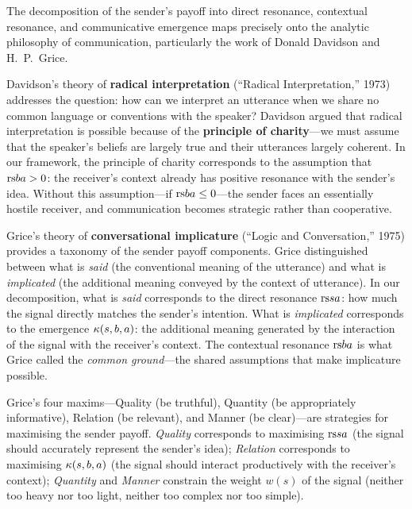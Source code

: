 \begin{interpretation}
\label{interp:ch13:davidson_grice}
The decomposition of the sender's payoff into direct resonance, contextual
resonance, and communicative emergence maps precisely onto the analytic
philosophy of communication, particularly the work of Donald Davidson and
H.~P.~Grice.

Davidson's theory of \textbf{radical interpretation} (``Radical
Interpretation,'' 1973) addresses the question: how can we interpret an
utterance when we share no common language or conventions with the speaker?
Davidson argued that radical interpretation is possible because of the
\textbf{principle of charity}---we must assume that the speaker's beliefs
are largely true and their utterances largely coherent.  In our framework,
the principle of charity corresponds to the assumption that $\mathrm{rs}{b}{a} > 0$:
the receiver's context already has positive resonance with the sender's
idea.  Without this assumption---if $\mathrm{rs}{b}{a} \leq 0$---the sender faces
an essentially hostile receiver, and communication becomes strategic rather
than cooperative.

Grice's theory of \textbf{conversational implicature} (``Logic and
Conversation,'' 1975) provides a taxonomy of the sender payoff components.
Grice distinguished between what is \emph{said} (the conventional meaning of
the utterance) and what is \emph{implicated} (the additional meaning conveyed
by the context of utterance).  In our decomposition, what is \emph{said}
corresponds to the direct resonance $\mathrm{rs}{s}{a}$: how much the signal
directly matches the sender's intention.  What is \emph{implicated}
corresponds to the emergence $\kappa(s, b, a)$: the additional meaning
generated by the interaction of the signal with the receiver's context.  The
contextual resonance $\mathrm{rs}{b}{a}$ is what Grice called the \emph{common
ground}---the shared assumptions that make implicature possible.

Grice's four maxims---Quality (be truthful), Quantity (be appropriately
informative), Relation (be relevant), and Manner (be clear)---are strategies
for maximising the sender payoff.  \emph{Quality} corresponds to maximising
$\mathrm{rs}{s}{a}$ (the signal should accurately represent the sender's idea);
\emph{Relation} corresponds to maximising $\kappa(s, b, a)$ (the signal
should interact productively with the receiver's context); \emph{Quantity}
and \emph{Manner} constrain the weight $w(s)$ of the signal (neither too
heavy nor too light, neither too complex nor too simple).


\end{interpretation}
